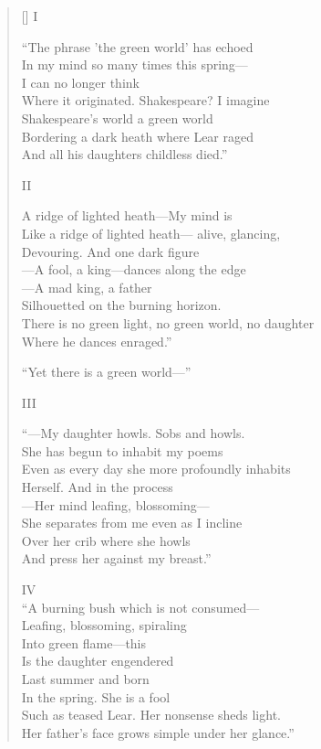 \settowidth{\versewidth}{There is no green light, no green world, no daughter}
\begin{verse}[\versewidth]
I

 ``The phrase 'the green world' has echoed\\
In my mind so many times this spring---\\
I can no longer think\\
Where it originated.  Shakespeare?   I imagine \\
Shakespeare's world a green world\\
Bordering a dark heath where Lear raged\\
And all his daughters childless died.''

II

A ridge of lighted heath---My mind is \\
Like a ridge of lighted heath--- alive, glancing,\\
Devouring. And one dark figure\\
---A fool, a king---dances along the edge\\
---A mad king, a father\\
Silhouetted on the burning horizon.\\
There is no green light, no green world, no daughter\\
Where he dances enraged.''

``Yet there is a green world---''

III

``---My daughter howls. Sobs and howls.\\
She has begun to inhabit my poems\\
Even as every day she more profoundly inhabits\\
Herself. And in the process\\
---Her mind leafing, blossoming---\\
She separates from me even as I incline\\
Over her crib where she howls\\
And press her against my breast.''











IV\\
``A burning bush which  is not consumed---\\
Leafing, blossoming, spiraling\\
Into green flame---this\\
Is the daughter engendered\\
Last summer and born\\
In the spring.   She is a fool\\
Such as teased Lear.   Her nonsense sheds light.\\
Her father's face grows simple under her glance.''


\end{verse}
